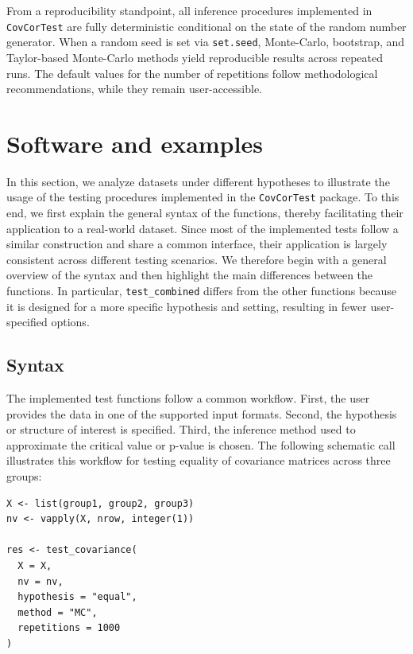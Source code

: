 From a reproducibility standpoint, all inference procedures implemented in \texttt{CovCorTest} are fully deterministic conditional on the state of the random number generator. When a random seed is set via \texttt{set.seed}, Monte-Carlo, bootstrap, and Taylor-based Monte-Carlo methods yield reproducible results across repeated runs. The default values for the number of repetitions follow methodological recommendations, while they remain user-accessible.

\section{Software and examples}\label{software-and-examples}

In this section, we analyze datasets under different hypotheses to illustrate
the usage of the testing procedures implemented in the \texttt{CovCorTest}
package. To this end, we first explain the general syntax of the functions,
thereby facilitating their application to a real-world dataset. Since most of
the implemented tests follow a similar construction and share a common
interface, their application is largely consistent across different testing
scenarios. We therefore begin with a general overview of the syntax and then
highlight the main differences between the functions. In particular,
\texttt{test\_combined} differs from the other functions because it is designed
for a more specific hypothesis and setting, resulting in fewer user-specified
options.

\subsection{Syntax}\label{syntax}

The implemented test functions follow a common workflow. First, the user
provides the data in one of the supported input formats. Second, the hypothesis
or structure of interest is specified. Third, the inference method used to
approximate the critical value or p-value is chosen. The following schematic
call illustrates this workflow for testing equality of covariance matrices
across three groups:

\begin{verbatim}
X <- list(group1, group2, group3)
nv <- vapply(X, nrow, integer(1))

res <- test_covariance(
  X = X,
  nv = nv,
  hypothesis = "equal",
  method = "MC",
  repetitions = 1000
)
\end{verbatim}

